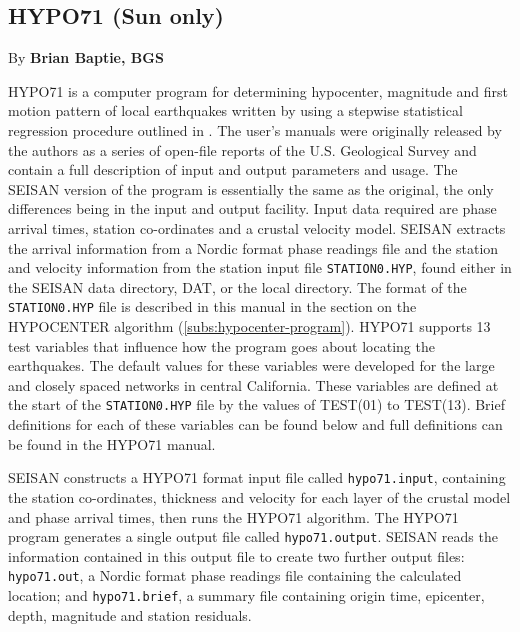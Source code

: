 
\subsection{HYPO71 (Sun only)}
By \textbf{Brian Baptie, BGS} 

HYPO71 is a computer program for determining hypocenter, magnitude and first motion pattern of local earthquakes written by \citet{lee1972} using a stepwise statistical regression procedure outlined in \citet{draper1966}. The user's manuals were originally released by the authors as a series of open-file reports of the U.S. Geological Survey and contain a full description of input and output parameters and usage. The SEISAN version of the program is essentially the same as the original, the only differences being in the input and output facility. Input data required are phase arrival times, station co-ordinates and a crustal velocity model. SEISAN extracts the arrival information from a Nordic format phase readings file and the station and velocity information from the station input file \texttt{STATION0.HYP}, found either in the SEISAN data directory, DAT, or the local directory. The format of the \texttt{STATION0.HYP} file is described in this manual in the section on the HYPOCENTER algorithm (\ref{subs:hypocenter-program}). HYPO71 supports 13 test variables that influence how the program goes about locating the earthquakes. The default values for these variables were developed for the large and closely spaced networks in central California. These variables are defined at the start of the \texttt{STATION0.HYP} file by the values of TEST(01) to TEST(13). Brief definitions for each of these variables can be found below and full definitions can be found in the HYPO71 manual. 

SEISAN constructs a HYPO71 format input file called \texttt{hypo71.input}, containing 
the station co-ordinates, thickness and velocity for each layer of the 
crustal model and phase arrival times, then runs the HYPO71 algorithm. 
The HYPO71 program generates a single output file called \texttt{hypo71.output}. 
SEISAN reads the information contained in this output file to create 
two further output files: \texttt{hypo71.out}, a Nordic format phase readings 
file containing the calculated location; and \texttt{hypo71.brief}, a summary file containing origin time, epicenter, depth, magnitude and station residuals. 

